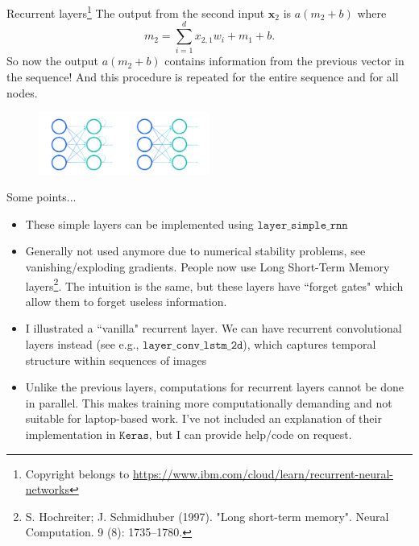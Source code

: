 \documentclass{beamer}
\begin{document}
\begin{frame}{Recurrent layers\footnote{Copyright belongs to \url{https://www.ibm.com/cloud/learn/recurrent-neural-networks}}} The output from the second input $\mathbf{x}_2$ is $a(m_2+b)$ where
\[
m_2=\sum^d_{i=1}x_{2,1}w_i+m_1+b.
\]
So now the output $a(m_2+b)$ contains information from the previous vector in the sequence! And this procedure is repeated for the entire sequence and for all nodes.
\begin{figure}
\centering
\includegraphics[width=0.5\textwidth]{Images/rnn.png}
\end{figure}
\end{frame}

\begin{frame}{Some points...}
\begin{itemize}
\item These simple layers can be implemented using $\texttt{layer\_simple\_rnn}$
\item Generally not used anymore due to numerical stability problems, see vanishing/exploding gradients. People now use Long Short-Term Memory layers\footnote{S. Hochreiter; J. Schmidhuber (1997). "Long short-term memory". Neural Computation. 9 (8): 1735–1780.}. The intuition is the same, but these layers have ``forget gates" which allow them to forget useless information.
\item I illustrated a ``vanilla" recurrent layer. We can have recurrent convolutional layers instead (see e.g., $\texttt{layer\_conv\_lstm\_2d}$), which captures temporal structure within sequences of images
\item Unlike the previous layers, computations for recurrent layers cannot be done in parallel. This makes training more computationally demanding and not suitable for laptop-based work. I've not included an explanation of their implementation in $\texttt{Keras}$, but I can provide help/code on request.
\end{itemize}

\end{frame}
\end{document}
